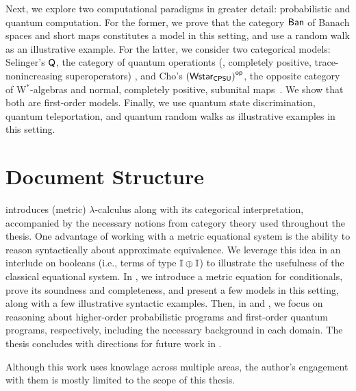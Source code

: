Next, we explore two computational paradigms in greater detail: probabilistic and quantum computation. For the former, we prove that the category $ \mathsf{Ban} $ of Banach spaces and short maps constitutes a model in this setting, and use a random walk as an illustrative example. For the latter, we consider two categorical models: Selinger’s \( \mathsf{Q} \), the category of quantum operationts (\ie, completely positive, trace-nonincreasing superoperators) \cite{selinger2004towards}, and Cho’s \( \left(\mathsf{Wstar_{CPSU}}\right)^{\mathsf{op}} \), the opposite category of W$^*$-algebras and normal, completely positive, subunital maps~\cite{choSemanticsQuantumProgramming2016}. We show that both are first-order models. Finally, we use quantum state discrimination, quantum teleportation, and quantum random walks as illustrative examples in this setting.




\section{Document Structure}

 introduces (metric) $\lambda$-calculus along with its categorical interpretation, accompanied by the necessary notions from category theory used throughout the thesis. One advantage of working with a metric equational system is the ability to reason syntactically about approximate equivalence. We leverage this idea in an interlude on booleans (i.e., terms of type $\mathbb{I} \oplus \mathbb{I}$) to illustrate the usefulness of the classical equational system. In , we introduce a metric equation for conditionals, prove its soundness and completeness, and present a few models in this setting, along with a few illustrative syntactic examples. Then, in  and , we focus on reasoning about higher-order probabilistic programs and first-order quantum programs, respectively,  including the necessary background in each domain. The thesis concludes with directions for future work in .

Although this work uses knowlage across multiple areas, the author's engagement with them is mostly limited to the scope of this thesis.


